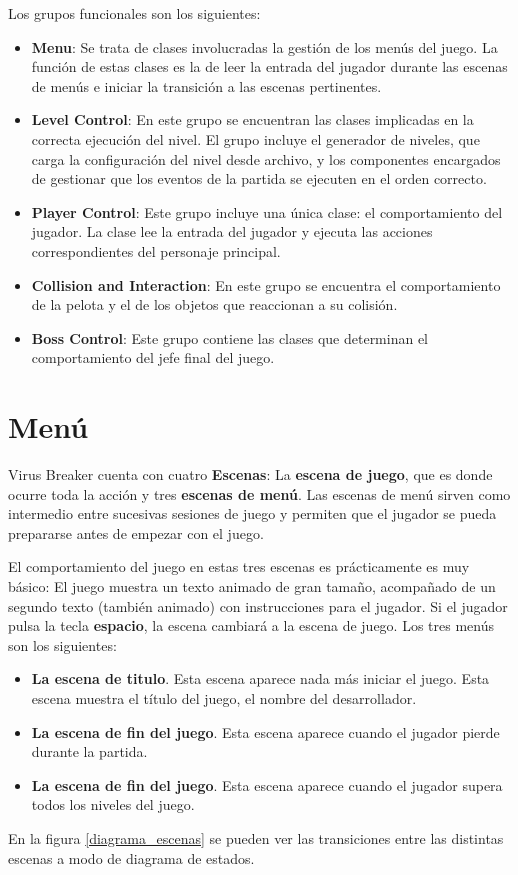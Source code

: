 Los grupos funcionales son los siguientes:
\begin{itemize}
\item \textbf{Menu}: Se trata de clases involucradas la gestión de los menús del juego. La función de estas clases es la de leer la entrada del jugador durante las escenas de menús e iniciar la transición a las escenas pertinentes.
\item \textbf{Level Control}: En este grupo se encuentran las clases implicadas en la correcta ejecución del nivel. El grupo incluye el generador de niveles, que carga la configuración del nivel desde archivo, y los componentes encargados de gestionar que los eventos de la partida se ejecuten en el orden correcto.
\item \textbf{Player Control}: Este grupo incluye una única clase: el comportamiento del jugador. La clase lee la entrada del jugador y ejecuta las acciones correspondientes del personaje principal.
\item \textbf{Collision and Interaction}: En este grupo se encuentra el comportamiento de la pelota y el de los objetos que reaccionan a su colisión.
\item \textbf{Boss Control}: Este grupo contiene las clases que determinan el comportamiento del jefe final del juego.
\end{itemize}

\section{Menú}
Virus Breaker cuenta con cuatro \textbf{Escenas}: La \textbf{escena de juego}, que es donde ocurre toda la acción y tres \textbf{escenas de menú}. Las escenas de menú sirven como intermedio entre sucesivas sesiones de juego y permiten que el jugador se pueda prepararse antes de empezar con el juego.

El comportamiento del juego en estas tres escenas es prácticamente es muy básico: El juego muestra un texto animado de gran tamaño, acompañado de un segundo texto (también animado) con instrucciones para el jugador. Si el jugador pulsa la tecla \textbf{espacio}, la escena cambiará a la escena de juego. Los tres menús son los siguientes:
\begin{itemize}
\item \textbf{La escena de titulo}. Esta escena aparece nada más iniciar el juego. Esta escena muestra el título del juego, el nombre del desarrollador.
\item \textbf{La escena de fin del juego}. Esta escena aparece cuando el jugador pierde durante la partida.
\item \textbf{La escena de fin del juego}. Esta escena aparece cuando el jugador supera todos los niveles del juego.
\end{itemize}
En la figura \ref{diagrama_escenas} se pueden ver las transiciones entre las distintas escenas a modo de diagrama de estados.

